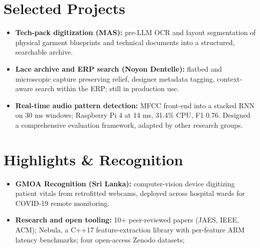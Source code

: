 \documentclass[11pt]{article}
\begin{document}
\section*{Selected Projects \footnotesize {}}
\begin{itemize}[leftmargin=1.2em, itemsep=-0.25em]
    \item \textbf{Tech-pack digitization (MAS):} pre-LLM OCR and layout segmentation of physical garment blueprints and technical documents into a structured, searchable archive.
    \item \textbf{Lace archive and ERP search (Noyon Dentelle):} flatbed and microscopic capture preserving relief, designer metadata tagging, context-aware search within the ERP; still in production use.
    \item \textbf{Real-time audio pattern detection:} MFCC front-end into a stacked RNN on 30 ms windows; Raspberry Pi 4 at 14 ms, 31.4\% CPU, F1 0.76. Designed a comprehensive evaluation framework, adapted by other research groups.
\end{itemize}

\vspace{-0.5em}
\section*{Highlights \& Recognition}
\begin{itemize}[leftmargin=1.2em, itemsep=-0.25em]
    \item \textbf{GMOA Recognition (Sri Lanka):} computer-vision device digitizing patient vitals from retrofitted webcams, deployed across hospital wards for COVID-19 remote monitoring.
    \item \textbf{Research and open tooling:} 10+ peer-reviewed papers (JAES, IEEE, ACM); Nebula, a C++17 feature-extraction library with per-feature ARM latency benchmarks; four open-access Zenodo datasets; {}
\end{itemize}
\end{document}
